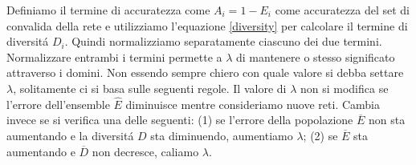 \documentclass[a4paper,10pt]{article}
\begin{document}
  Definiamo il termine di accuratezza come $A_i = 1-E_i$ come accuratezza del set di convalida della rete e utilizziamo l'equazione \ref{diversity} per calcolare il termine di diversit\'a $D_i$. Quindi normalizziamo separatamente ciascuno dei due termini. Normalizzare entrambi i termini permette a $\lambda$ di mantenere o stesso significato attraverso i domini. Non essendo sempre chiero con quale valore si debba settare $\lambda$, solitamente ci si basa sulle seguenti regole. Il valore di $\lambda$ non si modifica se l'errore dell'ensemble $\hat{E}$ diminuisce mentre consideriamo nuove reti. Cambia invece se si verifica una delle seguenti: (1) se l'errore della popolazione $\overline{E}$ non sta aumentando e la diversit\'a $D$ sta diminuendo, aumentiamo $\lambda$; (2) se $\overline{E}$ sta aumentando e $\overline{D}$ non decresce, caliamo $\lambda$.
  
\end{document}
